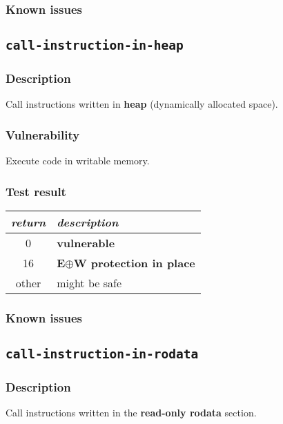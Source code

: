 \documentclass[a4paper]{book}
\begin{document}
\subsubsection{Known issues}

\newpage

\subsection{\texttt{call-instruction-in-heap}}\label{test-call-instruction-in-heap}

\subsubsection{Description}
Call instructions written in \textbf{heap} (dynamically allocated space).

\subsubsection{Vulnerability}
Execute code in writable memory.

\subsubsection{Test result}
\begin{tabular}{cl}
  \toprule
  \emph{return}  & \emph{description} \\
  \midrule
  0              & \textbf{vulnerable} \\
  16             & \textbf{E$\oplus$W protection in place} \\
  other          & might be safe \\
  \bottomrule
\end{tabular}
  
\subsubsection{Known issues}

\newpage

\subsection{\texttt{call-instruction-in-rodata}}\label{test-call-instruction-in-rodata}

\subsubsection{Description}
Call instructions written in the \textbf{read-only rodata} section.
\end{document}
